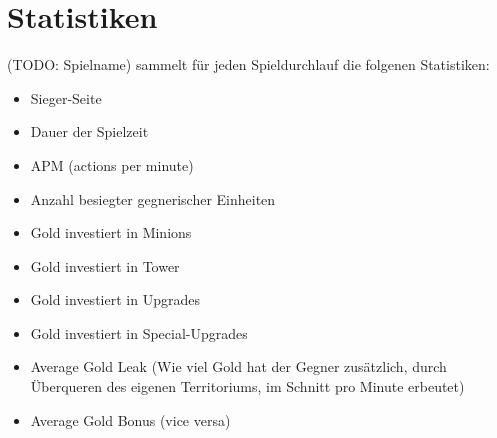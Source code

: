 \section{Statistiken}

%
%

(TODO: Spielname) sammelt für jeden Spieldurchlauf die folgenen Statistiken:
\begin{itemize}
	\item Sieger-Seite
	\item Dauer der Spielzeit
	\item APM (actions per minute)
	\item Anzahl besiegter gegnerischer Einheiten
	\item Gold investiert in Minions
	\item Gold investiert in Tower
	\item Gold investiert in Upgrades
	\item Gold investiert in Special-Upgrades
	\item Average Gold Leak (Wie viel Gold hat der Gegner zusätzlich, durch Überqueren des eigenen Territoriums, im Schnitt pro Minute erbeutet)
	\item Average Gold Bonus (vice versa)
\end{itemize}


